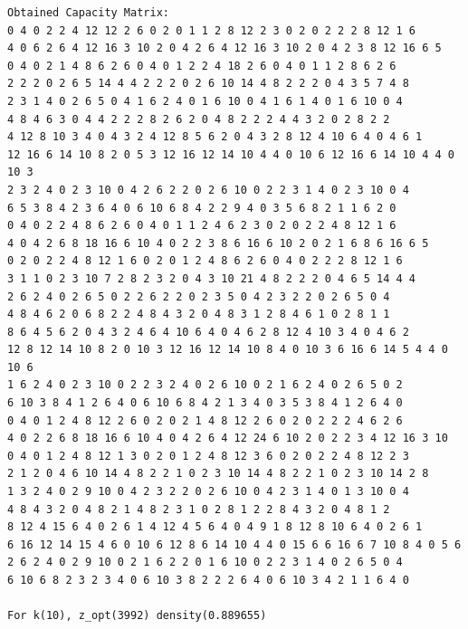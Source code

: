 \documentclass[11pt]{article}
\begin{document}
\begin{lstlisting}
Obtained Capacity Matrix:
0 4 0 2 2 4 12 12 2 6 0 2 0 1 1 2 8 12 2 3 0 2 0 2 2 2 8 12 1 6
4 0 6 2 6 4 12 16 3 10 2 0 4 2 6 4 12 16 3 10 2 0 4 2 3 8 12 16 6 5
0 4 0 2 1 4 8 6 2 6 0 4 0 1 2 2 4 18 2 6 0 4 0 1 1 2 8 6 2 6
2 2 2 0 2 6 5 14 4 4 2 2 2 0 2 6 10 14 4 8 2 2 2 0 4 3 5 7 4 8
2 3 1 4 0 2 6 5 0 4 1 6 2 4 0 1 6 10 0 4 1 6 1 4 0 1 6 10 0 4
4 8 4 6 3 0 4 4 2 2 2 8 2 6 2 0 4 8 2 2 2 4 4 3 2 0 2 8 2 2
4 12 8 10 3 4 0 4 3 2 4 12 8 5 6 2 0 4 3 2 8 12 4 10 6 4 0 4 6 1
12 16 6 14 10 8 2 0 5 3 12 16 12 14 10 4 4 0 10 6 12 16 6 14 10 4 4 0 10 3
2 3 2 4 0 2 3 10 0 4 2 6 2 2 0 2 6 10 0 2 2 3 1 4 0 2 3 10 0 4
6 5 3 8 4 2 3 6 4 0 6 10 6 8 4 2 2 9 4 0 3 5 6 8 2 1 1 6 2 0
0 4 0 2 2 4 8 6 2 6 0 4 0 1 1 2 4 6 2 3 0 2 0 2 2 4 8 12 1 6
4 0 4 2 6 8 18 16 6 10 4 0 2 2 3 8 6 16 6 10 2 0 2 1 6 8 6 16 6 5
0 2 0 2 2 4 8 12 1 6 0 2 0 1 2 4 8 6 2 6 0 4 0 2 2 2 8 12 1 6
3 1 1 0 2 3 10 7 2 8 2 3 2 0 4 3 10 21 4 8 2 2 2 0 4 6 5 14 4 4
2 6 2 4 0 2 6 5 0 2 2 6 2 2 0 2 3 5 0 4 2 3 2 2 0 2 6 5 0 4
4 8 4 6 2 0 6 8 2 2 4 8 4 3 2 0 4 8 3 1 2 8 4 6 1 0 2 8 1 1
8 6 4 5 6 2 0 4 3 2 4 6 4 10 6 4 0 4 6 2 8 12 4 10 3 4 0 4 6 2
12 8 12 14 10 8 2 0 10 3 12 16 12 14 10 8 4 0 10 3 6 16 6 14 5 4 4 0 10 6
1 6 2 4 0 2 3 10 0 2 2 3 2 4 0 2 6 10 0 2 1 6 2 4 0 2 6 5 0 2
6 10 3 8 4 1 2 6 4 0 6 10 6 8 4 2 1 3 4 0 3 5 3 8 4 1 2 6 4 0
0 4 0 1 2 4 8 12 2 6 0 2 0 2 1 4 8 12 2 6 0 2 0 2 2 2 4 6 2 6
4 0 2 2 6 8 18 16 6 10 4 0 4 2 6 4 12 24 6 10 2 0 2 2 3 4 12 16 3 10
0 4 0 1 2 4 8 12 1 3 0 2 0 1 2 4 8 12 3 6 0 2 0 2 2 4 8 12 2 3
2 1 2 0 4 6 10 14 4 8 2 2 1 0 2 3 10 14 4 8 2 2 1 0 2 3 10 14 2 8
1 3 2 4 0 2 9 10 0 4 2 3 2 2 0 2 6 10 0 4 2 3 1 4 0 1 3 10 0 4
4 8 4 3 2 0 4 8 2 1 4 8 2 3 1 0 2 8 1 2 2 8 4 3 2 0 4 8 1 2
8 12 4 15 6 4 0 2 6 1 4 12 4 5 6 4 0 4 9 1 8 12 8 10 6 4 0 2 6 1
6 16 12 14 15 4 6 0 10 6 12 8 6 14 10 4 4 0 15 6 6 16 6 7 10 8 4 0 5 6
2 6 2 4 0 2 9 10 0 2 1 6 2 2 0 1 6 10 0 2 2 3 1 4 0 2 6 5 0 4
6 10 6 8 2 3 2 3 4 0 6 10 3 8 2 2 2 6 4 0 6 10 3 4 2 1 1 6 4 0

For k(10), z_opt(3992) density(0.889655)


\end{lstlisting}
\end{document}
